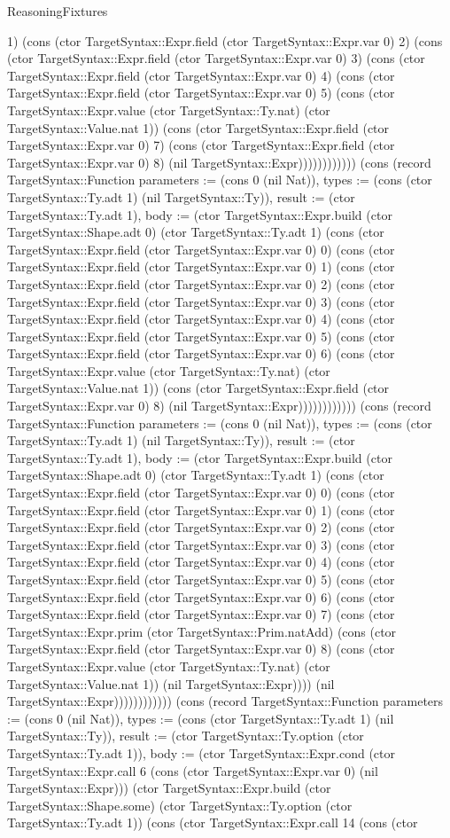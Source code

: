 \begin{lexlean}{ReasoningFixtures}
\begin{semanticmodule}
{1) (cons (ctor TargetSyntax::Expr.field (ctor TargetSyntax::Expr.var 0) 2) (cons (ctor TargetSyntax::Expr.field (ctor TargetSyntax::Expr.var 0) 3) (cons (ctor TargetSyntax::Expr.field (ctor TargetSyntax::Expr.var 0) 4) (cons (ctor TargetSyntax::Expr.field (ctor TargetSyntax::Expr.var 0) 5) (cons (ctor TargetSyntax::Expr.value (ctor TargetSyntax::Ty.nat) (ctor TargetSyntax::Value.nat 1)) (cons (ctor TargetSyntax::Expr.field (ctor TargetSyntax::Expr.var 0) 7) (cons (ctor TargetSyntax::Expr.field (ctor TargetSyntax::Expr.var 0) 8) (nil TargetSyntax::Expr)))))))))))}) (cons (record TargetSyntax::Function {parameters := (cons 0 (nil Nat)), types := (cons (ctor TargetSyntax::Ty.adt 1) (nil TargetSyntax::Ty)), result := (ctor TargetSyntax::Ty.adt 1), body := (ctor TargetSyntax::Expr.build (ctor TargetSyntax::Shape.adt 0) (ctor TargetSyntax::Ty.adt 1) (cons (ctor TargetSyntax::Expr.field (ctor TargetSyntax::Expr.var 0) 0) (cons (ctor TargetSyntax::Expr.field (ctor TargetSyntax::Expr.var 0) 1) (cons (ctor TargetSyntax::Expr.field (ctor TargetSyntax::Expr.var 0) 2) (cons (ctor TargetSyntax::Expr.field (ctor TargetSyntax::Expr.var 0) 3) (cons (ctor TargetSyntax::Expr.field (ctor TargetSyntax::Expr.var 0) 4) (cons (ctor TargetSyntax::Expr.field (ctor TargetSyntax::Expr.var 0) 5) (cons (ctor TargetSyntax::Expr.field (ctor TargetSyntax::Expr.var 0) 6) (cons (ctor TargetSyntax::Expr.value (ctor TargetSyntax::Ty.nat) (ctor TargetSyntax::Value.nat 1)) (cons (ctor TargetSyntax::Expr.field (ctor TargetSyntax::Expr.var 0) 8) (nil TargetSyntax::Expr)))))))))))}) (cons (record TargetSyntax::Function {parameters := (cons 0 (nil Nat)), types := (cons (ctor TargetSyntax::Ty.adt 1) (nil TargetSyntax::Ty)), result := (ctor TargetSyntax::Ty.adt 1), body := (ctor TargetSyntax::Expr.build (ctor TargetSyntax::Shape.adt 0) (ctor TargetSyntax::Ty.adt 1) (cons (ctor TargetSyntax::Expr.field (ctor TargetSyntax::Expr.var 0) 0) (cons (ctor TargetSyntax::Expr.field (ctor TargetSyntax::Expr.var 0) 1) (cons (ctor TargetSyntax::Expr.field (ctor TargetSyntax::Expr.var 0) 2) (cons (ctor TargetSyntax::Expr.field (ctor TargetSyntax::Expr.var 0) 3) (cons (ctor TargetSyntax::Expr.field (ctor TargetSyntax::Expr.var 0) 4) (cons (ctor TargetSyntax::Expr.field (ctor TargetSyntax::Expr.var 0) 5) (cons (ctor TargetSyntax::Expr.field (ctor TargetSyntax::Expr.var 0) 6) (cons (ctor TargetSyntax::Expr.field (ctor TargetSyntax::Expr.var 0) 7) (cons (ctor TargetSyntax::Expr.prim (ctor TargetSyntax::Prim.natAdd) (cons (ctor TargetSyntax::Expr.field (ctor TargetSyntax::Expr.var 0) 8) (cons (ctor TargetSyntax::Expr.value (ctor TargetSyntax::Ty.nat) (ctor TargetSyntax::Value.nat 1)) (nil TargetSyntax::Expr)))) (nil TargetSyntax::Expr)))))))))))}) (cons (record TargetSyntax::Function {parameters := (cons 0 (nil Nat)), types := (cons (ctor TargetSyntax::Ty.adt 1) (nil TargetSyntax::Ty)), result := (ctor TargetSyntax::Ty.option (ctor TargetSyntax::Ty.adt 1)), body := (ctor TargetSyntax::Expr.cond (ctor TargetSyntax::Expr.call 6 (cons (ctor TargetSyntax::Expr.var 0) (nil TargetSyntax::Expr))) (ctor TargetSyntax::Expr.build (ctor TargetSyntax::Shape.some) (ctor TargetSyntax::Ty.option (ctor TargetSyntax::Ty.adt 1)) (cons (ctor TargetSyntax::Expr.call 14 (cons (ctor }
\end{semanticmodule}
\end{lexlean}
